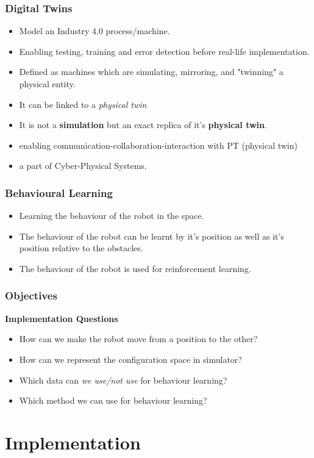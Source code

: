 \documentclass{beamer}
\begin{document}
\begin{frame}
    \frametitle{Digital Twins}
    \begin{itemize}
        \item Model an Industry 4.0 process/machine.
        \item Enabling testing, training and error detection before real-life implementation.
        \item Defined as machines which are simulating, mirroring, and "twinning" a physical entity.
        \item It can be linked to a \textit{physical twin} \cite{p2}
        \item It is not a \textbf{simulation} but an exact replica of it's \textbf{physical twin}.
        \item enabling communication-collaboration-interaction with PT (physical twin)
        \item a part of Cyber-Physical Systems.
    \end{itemize}
\end{frame}

\begin{frame}
    \frametitle{Behavioural Learning}
    \begin{itemize}
        \item Learning the behaviour of the robot in the space.
        \item The behaviour of the robot can be learnt by it's position as well as it's position relative to the obstacles.
        \item The behaviour of the robot is used for reinforcement learning.
    \end{itemize}
\end{frame}

\begin{frame}
    \frametitle{Objectives}
    \textbf{Implementation Questions}
    \begin{itemize}
        \item How can we make the robot move from a position to the other?
        \item How can we represent the configuration space in simulator?
        \item Which data can \textit{we use/not use} for behaviour learning?
        \item Which method we can use for behaviour learning?
    \end{itemize}
\end{frame}

\section{Implementation}
\end{document}
